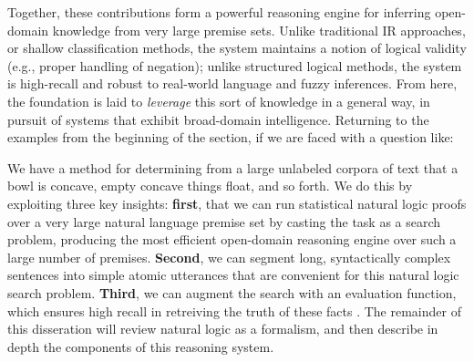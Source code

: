 %
%
Together, these contributions form a powerful reasoning engine for inferring open-domain
  knowledge from very large premise sets.
Unlike traditional IR approaches, or shallow classification methods, the system maintains
  a notion of logical validity (e.g., proper handling of negation);
  unlike structured logical methods, the system is high-recall and robust to
  real-world language and fuzzy inferences.
From here, the foundation is laid to \textit{leverage} this sort of knowledge in a
  general way, in pursuit of systems that exhibit broad-domain intelligence.
Returning to the examples from the beginning of the section, if we are faced with a question like:

\begin{displayquote}
\end{displayquote}

\noindent We have a method for determining from a large unlabeled corpora of text
  that a bowl is concave, empty concave things float, and so forth.
We do this by exploiting three key insights: \textbf{first}, that we can run statistical natural logic proofs
  over a very large natural language premise set by casting the task as a search problem, producing
  the most efficient open-domain reasoning engine over such a large number of premises.
\textbf{Second}, we can segment long, syntactically complex sentences into simple atomic utterances that are
  convenient for this natural logic search problem.
\textbf{Third}, we can augment the search with an evaluation function, which ensures high recall in retreiving
  the truth of these facts .
The remainder of this disseration will review natural logic as a formalism, and then describe in depth
  the components of this reasoning system.
